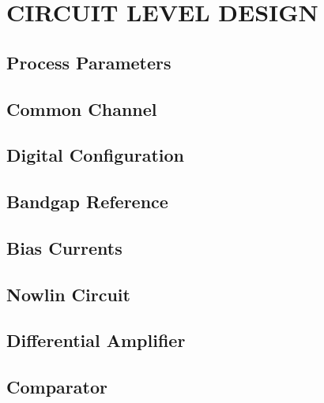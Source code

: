 \documentclass[12pt,oneside,final]{siuethesis}
\theoremstyle{definition}
\begin{document}
\chapter{CIRCUIT LEVEL DESIGN}

\section{Process Parameters}


\section{Common Channel}

\section{Digital Configuration}

\section{Bandgap Reference}

\section{Bias Currents}

\section{Nowlin Circuit}

\section{Differential Amplifier}

\section{Comparator}
\end{document}
